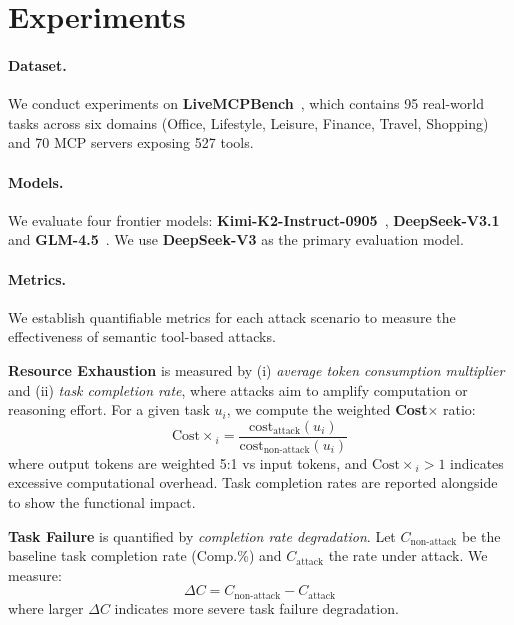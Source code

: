 \section{Experiments}

\paragraph{Dataset.}
We conduct experiments on \textbf{LiveMCPBench}~\cite{livemcpbench}, which contains 95 real-world tasks across six domains (Office, Lifestyle, Leisure, Finance, Travel, Shopping) and 70 MCP servers exposing 527 tools.

\paragraph{Models.}
We evaluate four frontier models: \textbf{Kimi-K2-Instruct-0905}~\cite{kimiteam2025kimik2openagentic}, \textbf{DeepSeek-V3.1}~\cite{deepseekai2024deepseekv3technicalreport} and \textbf{GLM-4.5}~\cite{5team2025glm45agenticreasoningcoding}. We use \textbf{DeepSeek-V3} as the primary evaluation model.

\paragraph{Metrics.}
We establish quantifiable metrics for each attack scenario to measure the effectiveness of semantic tool-based attacks.

\textbf{Resource Exhaustion} is measured by (i) \emph{average token consumption multiplier} and (ii) \emph{task completion rate}, where attacks aim to amplify computation or reasoning effort. For a given task $u_i$, we compute the weighted \textbf{Cost$\times$} ratio:
\begin{equation}
\mathrm{Cost\times}_i = \frac{\mathrm{cost}_{\text{attack}}(u_i)}{\mathrm{cost}_{\text{non-attack}}(u_i)}
\end{equation}
where output tokens are weighted 5:1 vs input tokens, and $\mathrm{Cost\times}_i > 1$ indicates excessive computational overhead. Task completion rates are reported alongside to show the functional impact.

\textbf{Task Failure} is quantified by \emph{completion rate degradation}. Let $C_{\text{non-attack}}$ be the baseline task completion rate (Comp.\%) and $C_{\text{attack}}$ the rate under attack. We measure:
\begin{equation}
\Delta C = C_{\text{non-attack}} - C_{\text{attack}}
\end{equation}
where larger $\Delta C$ indicates more severe task failure degradation.

